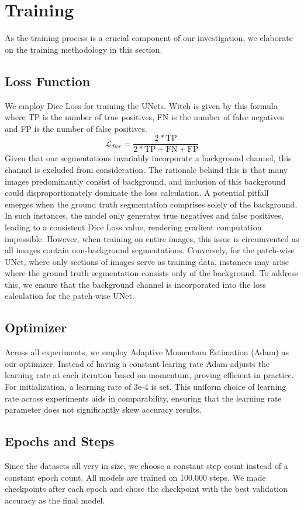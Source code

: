 \section{Training}
As the training process is a crucial component of our investigation, we elaborate on the training methodology in this section.
\subsection{Loss Function}
We employ Dice Loss for training the UNets. Witch is given by this formula where TP is the number of true positives, FN is the number of false negatives and FP is the number of false positives.
$$\mathcal{L}_{dice}=\frac{2*\text{TP}}{2*\text{TP}+\text{FN}+\text{FP}}$$
Given that our segmentations invariably incorporate a background channel, this channel is excluded from consideration.
The rationale behind this is that many images predominantly consist of background, and inclusion of this background could disproportionately dominate the loss calculation.
A potential pitfall emerges when the ground truth segmentation comprises solely of the background. In such instances, the model only generates true negatives and false positives,
leading to a consistent Dice Loss value, rendering gradient computation impossible. However, when training on entire images,
this issue is circumvented as all images contain non-background segmentations. Conversely, for the patch-wise UNet, where only sections of images serve as training data,
instances may arise where the ground truth segmentation consists only of the background. To address this,
we ensure that the background channel is incorporated into the loss calculation for the patch-wise UNet.

\subsection{Optimizer}
Across all experiments, we employ Adaptive Momentum Estimation (Adam)\cite{kingma_adam_2017} as our optimizer.
Instead of having a constant learing rate Adam adjusts the learning rate at each iteration based on momentum, proving efficient in practice. For initialization,
a learning rate of 3e-4 is set. This uniform choice of learning rate across experiments aids in comparability, ensuring that the learning rate parameter does not significantly skew accuracy results.

\subsection{Epochs and Steps}
Since the datasets all very in size, we choose a constant step count instead of a constant epoch count. All models are trained on 100.000 steps.
We made checkpoints after each epoch and chose the checkpoint with the best validation accuracy as the final model.

